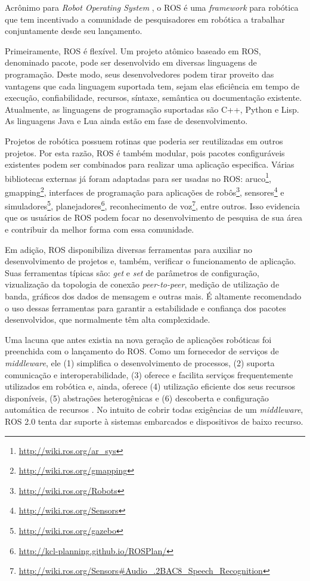     Acrônimo para \textit{Robot Operating System} \cite{ref:quigley2009ros}, o ROS é uma \textit{framework} para robótica que tem incentivado a comunidade de pesquisadores em robótica a trabalhar conjuntamente desde seu lançamento.
    
    Primeiramente, ROS é flexível. Um projeto atômico baseado em ROS, denominado pacote, pode ser desenvolvido em diversas linguagens de programação. Deste modo, seus desenvolvedores podem tirar proveito das vantagens que cada linguagem suportada tem, sejam elas eficiência em tempo de execução, confiabilidade, recursos, síntaxe, semântica ou documentação existente. Atualmente, as linguagens de programação suportadas são C++, Python e Lisp. As linguagens Java e Lua ainda estão em fase de desenvolvimento.
    
    Projetos de robótica possuem rotinas que poderia ser reutilizadas em outros projetos. Por esta razão, ROS é também modular, pois pacotes configuráveis existentes podem ser combinados para realizar uma aplicação especifica. Várias bibliotecas externas já foram adaptadas para ser usadas no ROS: aruco\footnote{\url{http://wiki.ros.org/ar_sys}}, gmapping\footnote{\url{http://wiki.ros.org/gmapping}}, interfaces de programação para aplicações de robôs\footnote{\url{http://wiki.ros.org/Robots}}, sensores\footnote{\url{http://wiki.ros.org/Sensors}} e simuladores\footnote{\url{http://wiki.ros.org/gazebo}}, planejadores\footnote{\url{http://kcl-planning.github.io/ROSPlan/}}, reconhecimento de voz\footnote{\url{http://wiki.ros.org/Sensors\#Audio_.2BAC8_Speech_Recognition}}, entre outros. Isso evidencia que os usuários de ROS podem focar no desenvolvimento de pesquisa de sua área e contribuir da melhor forma com essa comunidade.
    
    Em adição, ROS disponibiliza diversas ferramentas para auxiliar no desenvolvimento de projetos e, também, verificar o funcionamento de aplicação. Suas ferramentas típicas são: \textit{get} e \textit{set} de parâmetros de configuração, vizualização da topologia de conexão \textit{peer-to-peer}, medição de utilização de banda, gráficos dos dados de mensagem e outras mais. É altamente recomendado o uso dessas ferramentas para garantir a estabilidade e confiança dos pacotes desenvolvidos, que normalmente têm alta complexidade.
    
    Uma lacuna que antes existia na nova geração de aplicações robóticas foi preenchida com o lançamento do ROS. Como um fornecedor de serviços de \textit{middleware}, ele (1) simplifica o desenvolvimento de processos, (2) suporta comunicação e interoperabilidade, (3) oferece e facilita serviços frequentemente utilizados em robótica e, ainda, oferece (4) utilização eficiente dos seus recursos disponíveis, (5) abstrações heterogênicas e (6) descoberta e configuração automática de recursos \cite{ref:quigley2009ros}. No intuito de cobrir todas exigências de um \textit{middleware}, ROS 2.0 tenta dar suporte à sistemas embarcados e dispositivos de baixo recurso.
    
